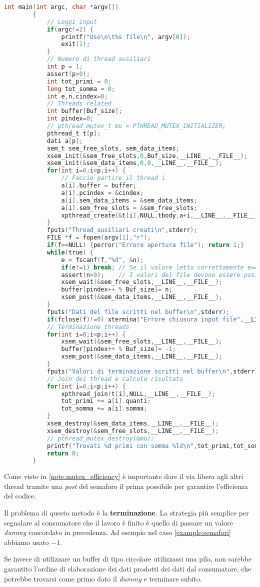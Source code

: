 \begin{example}
\begin{lstlisting}[language=C]
		int main(int argc, char *argv[])
		{
			// Leggi input
			if(argc!=2) {
				printf("Uso\n\t%s file\n", argv[0]);
				exit(1);
			}
			// Numero di thread ausiliari 
			int p = 1;
			assert(p>0);
			int tot_primi = 0;
			long tot_somma = 0;
			int e,n,cindex=0;    
			// Threads related
			int buffer[Buf_size];
			int pindex=0;
			// pthread_mutex_t mu = PTHREAD_MUTEX_INITIALIZER;
			pthread_t t[p];
			dati a[p];
			sem_t sem_free_slots, sem_data_items;
			xsem_init(&sem_free_slots,0,Buf_size,__LINE__,__FILE__);
			xsem_init(&sem_data_items,0,0,__LINE__,__FILE__);
			for(int i=0;i<p;i++) {
				// Faccio partire il thread i
				a[i].buffer = buffer;
				a[i].pcindex = &cindex;
				a[i].sem_data_items = &sem_data_items;
				a[i].sem_free_slots = &sem_free_slots;
				xpthread_create(&t[i],NULL,tbody,a+i,__LINE__,__FILE__);
			}
			fputs("Thread ausiliari creati\n",stderr);
			FILE *f = fopen(argv[1],"r");
			if(f==NULL) {perror("Errore apertura file"); return 1;}
			while(true) {
				e = fscanf(f,"%d", &n);
				if(e!=1) break; // Se il valore letto correttamente e==1
				assert(n>0);    // I valori del file devono essere positivi
				xsem_wait(&sem_free_slots,__LINE__,__FILE__);
				buffer[pindex++ % Buf_size]= n;
				xsem_post(&sem_data_items,__LINE__,__FILE__);
			}
			fputs("Dati del file scritti nel buffer\n",stderr);
			if(fclose(f)!=0) xtermina("Errore chiusura input file",__LINE__,__FILE__);
			// Terminazione threads
			for(int i=0;i<p;i++) {
				xsem_wait(&sem_free_slots,__LINE__,__FILE__);
				buffer[pindex++ % Buf_size]= -1;
				xsem_post(&sem_data_items,__LINE__,__FILE__);
			}
			fputs("Valori di terminazione scritti nel buffer\n",stderr);
			// Join dei thread e calcolo risultato
			for(int i=0;i<p;i++) {
				xpthread_join(t[i],NULL,__LINE__,__FILE__);
				tot_primi += a[i].quanti;
				tot_somma += a[i].somma;
			}
			xsem_destroy(&sem_data_items,__LINE__,__FILE__);
			xsem_destroy(&sem_free_slots,__LINE__,__FILE__);
			// pthread_mutex_destroy(&mu);
			printf("Trovati %d primi con somma %ld\n",tot_primi,tot_somma);
			return 0;
		}
	\end{lstlisting}
\end{example}
\begin{note}
	Come visto in \ref{note:mutex_efficiency} è importante dare il via libera agli altri thread tramite una \emph{post} del semaforo il prima possibile per garantire l'efficienza del codice.
\end{note}
Il problema di questo metodo è la \textbf{terminazione}. La strategia più semplice per segnalare al consumatore che il lavoro è finito è quello di passare un valore \emph{dummy} concordato in precedenza. Ad esempio nel caso \ref{example:semafori} abbiamo usato $-1$.

\begin{observation}
	Se invece di utilizzare un buffer di tipo circolare utilizzassi una pila, non sarebbe garantito l'ordine di elaborazione dei dati prodotti dei dati dal consumatore, che potrebbe trovarsi come primo dato il \emph{dummy} e terminare subito.
\end{observation}